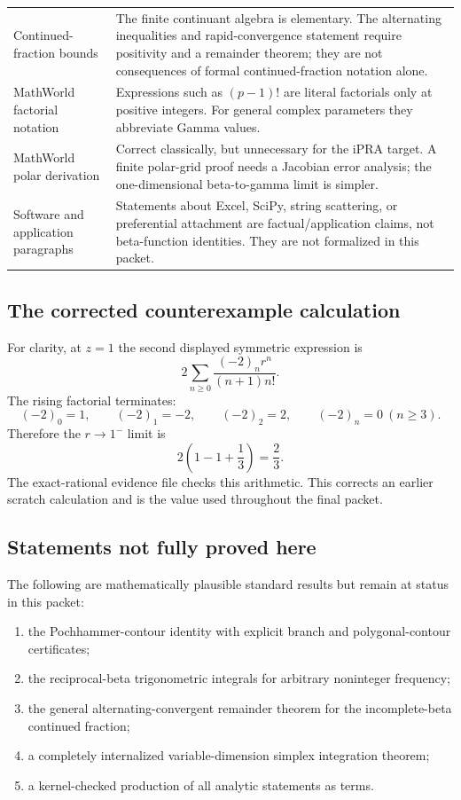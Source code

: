 \begin{longtable}{@{}p{}p{}@{}}
Continued-fraction bounds &
The finite continuant algebra is elementary.  The alternating inequalities and rapid-convergence statement require positivity and a remainder theorem; they are not consequences of formal continued-fraction notation alone.\\

MathWorld factorial notation &
Expressions such as $(p-1)!$ are literal factorials only at positive integers.  For general complex parameters they abbreviate Gamma values.\\

MathWorld polar derivation &
Correct classically, but unnecessary for the iPRA target.  A finite polar-grid proof needs a Jacobian error analysis; the one-dimensional beta-to-gamma limit is simpler.\\

Software and application paragraphs &
Statements about Excel, SciPy, string scattering, or preferential attachment are factual/application claims, not beta-function identities.  They are not formalized in this packet.\\
\bottomrule
\end{longtable}

\subsection{The corrected counterexample calculation}

For clarity, at $z=1$ the second displayed symmetric expression is
\[
 2\sum_{n\ge0}\frac{(-2)_n r^n}{(n+1)n!}.
\]
The rising factorial terminates:
\[
 (-2)_0=1,\qquad(-2)_1=-2,\qquad(-2)_2=2,\qquad(-2)_n=0\ (n\ge3).
\]
Therefore the $r\to1^-$ limit is
\[
 2\left(1-1+\frac13\right)=\frac23.
\]
The exact-rational evidence file checks this arithmetic.  This corrects an earlier scratch calculation and is the value used throughout the final packet.

\subsection{Statements not fully proved here}

The following are mathematically plausible standard results but remain at status \statusC{} in this packet:

\begin{enumerate}
\item the Pochhammer-contour identity with explicit branch and polygonal-contour certificates;
\item the reciprocal-beta trigonometric integrals for arbitrary noninteger frequency;
\item the general alternating-convergent remainder theorem for the incomplete-beta continued fraction;
\item a completely internalized variable-dimension simplex integration theorem;
\item a kernel-checked production of all analytic statements as  terms.
\end{enumerate}

